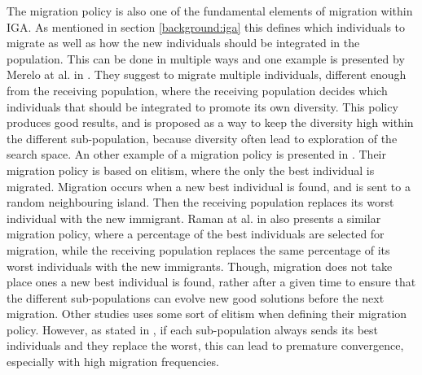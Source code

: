 The migration policy is also one of the fundamental elements of migration within IGA. As mentioned in section \ref{background:iga} this defines which individuals to migrate as well as how the new individuals should be integrated in the population. This can be done in multiple ways and one example is presented by Merelo at al. in \cite{IGA:multikulti}. They suggest to migrate multiple individuals, different enough from the receiving population, where the receiving population decides which individuals that should be integrated to promote its own diversity. This policy produces good results, and is proposed as a way to keep the diversity high within the different sub-population, because diversity often lead to exploration of the search space. An other example of a migration policy is presented in  \cite{IGA:gong-fukunaga-island-model-random-hetereogeneous-parameter-settings}. Their migration policy is based on elitism, where the only the best individual is migrated. Migration occurs when a new best individual is found, and is sent to a random neighbouring island. Then the receiving population replaces its worst individual with the new immigrant. Raman at al. in \cite{IGA:attribute-reduction} also presents a similar migration policy, where a percentage of the best individuals are selected for migration, while the receiving population replaces the same percentage of its worst individuals with the new immigrants. Though, migration does not take place ones a new best individual is found, rather after a given time to ensure that the different sub-populations can evolve new good solutions before the next migration. Other studies \cite{IGA:advance-iga-for-optimization-problems, IGA:hybrid-ga-jssp, IGA:DGA-optimization-of-wind-farm} uses some sort of elitism when defining their migration policy. However, as stated in \cite{IGA:DGA-optimization-of-wind-farm}, if each sub-population always sends its best individuals and they replace the worst, this can lead to premature convergence, especially with high migration frequencies. 




